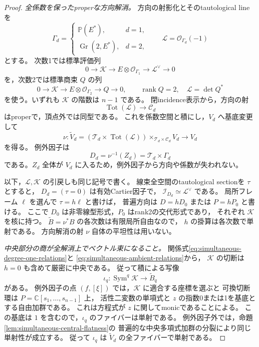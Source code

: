 \begin{proof}
\emph{全係数を保ったproperな方向解消。}
方向の射影化とそのtautological lineを
\[
 \Gamma_d=
 \begin{cases}
  \mathbb P(E^*),&d=1,\\
  \operatorname{Gr}(2,E^*),&d=2,
 \end{cases}
 \qquad \mathcal L=\mathcal O_{\Gamma_d}(-1)
\]
とする。
次数1では標準評価列
\[
 0\longrightarrow\mathcal K\longrightarrow
 E\otimes\mathcal O_{\Gamma_1}\longrightarrow\mathcal L^\vee
 \longrightarrow0
\]
を，次数2では標準商束 $Q$ の列
\[
 0\longrightarrow\mathcal K\longrightarrow
 E\otimes\mathcal O_{\Gamma_2}\longrightarrow Q\longrightarrow0,
 \qquad \operatorname{rank}Q=2,
 \quad\mathcal L=\det Q^*
\]
を使う。いずれも $\mathcal K$ の階数は $n-1$ である。
閉incidence表示から，方向の射
\[
 \operatorname{Tot}(\mathcal L)\longrightarrow\mathcal C_d
\]
はproperで，頂点外では同型である。
これを係数空間と積にし，$V_d$ へ基底変更して
\[
 \nu:\widetilde V_d=
  (\mathcal T_d\times\operatorname{Tot}(\mathcal L))
       \times_{\mathcal T_d\times\mathcal C_d}V_d
       \longrightarrow V_d
\]
を得る。
例外因子は
\[
 D_d=\nu^{-1}(Z_d)=\mathcal T_d\times\Gamma_d
\]
である。$Z_d$ 全体が $V_d$ に入るため，例外因子から方向や係数が失われない。

以下，$\mathcal L,\mathcal K$ の引戻しも同じ記号で書く。
線束全空間のtautological sectionを $\tau$ とすると，
$D_d=(\tau=0)$ は有効Cartier因子で，
$\mathcal I_{D_d}\simeq\mathcal L^\vee$ である。
局所フレーム $\ell$ を選んで $\tau=h\ell$ と書けば，
普遍方向は $D=hD_0$ または $P=hP_0$ と書ける。
ここで $D_0$ は非零線型形式，$P_0$ はrank2の交代形式であり，
それぞれ $\mathcal K$ を核に持つ。
$\widetilde B=\nu^*B$ の各次数は有限局所自由なので，
$h$ の掛算は各次数で単射である。
方向解消の射 $\nu$ 自体の平坦性は用いない。

\emph{中央部分の商が全解消上でベクトル束になること。}
関係式\eqref{eq:simultaneous-degree-one-relations}と
\eqref{eq:simultaneous-ambient-relations}から，
$\mathcal K$ の切断は $h=0$ も含めて厳密に中央である。
従って積による写像
\[
 \iota_q:\operatorname{Sym}^q\mathcal K\longrightarrow\widetilde B_q
\]
がある。
例外因子の点 $(f,[\xi])$ では，$\mathcal K$ に適合する座標を選ぶと
可換切断環は $P=\mathbb C[s_1,\ldots,s_{n-1}]$ 上，
活性二変数の単項式と $z$ の指数0または1を基底とする自由加群である。
これは方程式が $z$ に関してmonicであることによる。
この基底は $1$ を含むので，$\iota_q$ のファイバーは単射である。
例外因子外では，命題\ref{lem:simultaneous-central-flatness}の
普遍的な中央多項式加群の分裂により同じ単射性が成立する。
従って $\iota_q$ は $\widetilde V_d$ の全ファイバーで単射である。


\end{proof}
